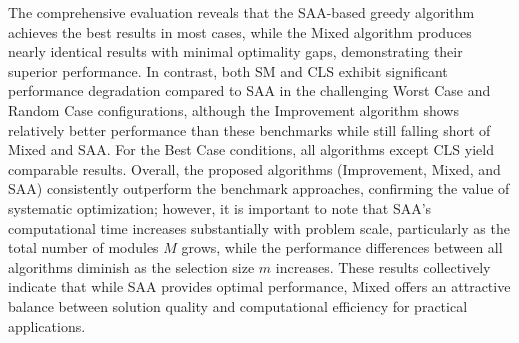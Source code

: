 \documentclass[opre,sglanonrev]{informs4}
\begin{document}
The comprehensive evaluation reveals that the SAA-based greedy algorithm achieves the best results in most cases, while the Mixed algorithm produces nearly identical results with minimal optimality gaps, demonstrating their superior performance. In contrast, both SM and CLS exhibit significant performance degradation compared to SAA in the challenging Worst Case and Random Case configurations, although the Improvement algorithm shows relatively better performance than these benchmarks while still falling short of Mixed and SAA. For the Best Case conditions, all algorithms except CLS yield comparable results. Overall, the proposed algorithms (Improvement, Mixed, and SAA) consistently outperform the benchmark approaches, confirming the value of systematic optimization; however, it is important to note that SAA's computational time increases substantially with problem scale, particularly as the total number of modules $M$ grows, while the performance differences between all algorithms diminish as the selection size $m$ increases. These results collectively indicate that while SAA provides optimal performance, Mixed offers an attractive balance between solution quality and computational efficiency for practical applications.





 
 
\end{document}
